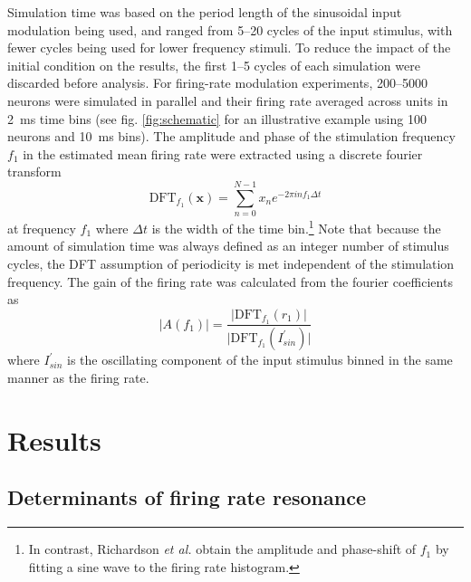 \documentclass[12pt]{article}
\renewcommand{\vec}[1]{\mathbf{#1}}
\begin{document}
Simulation time was based on the period length of the sinusoidal input modulation being used, and ranged from 5--20 cycles of the input stimulus, with fewer cycles being used for lower frequency stimuli.
To reduce the impact of the initial condition on the results, the first 1--5 cycles of each simulation were discarded before analysis.
For firing-rate modulation experiments, 200--5000 neurons were simulated in parallel and their firing rate averaged across units in \SI{2}{\ms} time bins (see fig. \ref{fig:schematic} for an illustrative example using 100 neurons and \SI{10}{\ms} bins).
The amplitude and phase of the stimulation frequency $f_1$ in the estimated mean firing rate were extracted using a discrete fourier transform
\begin{equation}
    \mathrm{DFT}_{f_1}(\vec{x}) = \sum_{n = 0}^{N - 1} x_n e^{-2 \pi i n f_1 \Delta t}
\end{equation}
at frequency $f_1$ where $\Delta t$ is the width of the time bin.\footnote{In contrast, Richardson \textit{et al.} obtain the amplitude and phase-shift of $f_1$ by fitting a sine wave to the firing rate histogram.}
Note that because the amount of simulation time was always defined as an integer number of stimulus cycles, the DFT assumption of periodicity is met independent of the stimulation frequency.
The gain of the firing rate was calculated from the fourier coefficients as
\begin{equation}
    \vert A(f_1) \vert = \frac{ \vert \mathrm{DFT}_{f_1}(r_1) \vert }{ \vert \mathrm{DFT}_{f_1}(I_{sin}^\prime) \vert }
\end{equation}
where $I_{sin}^\prime$ is the oscillating component of the input stimulus binned in the same manner as the firing rate.


\section{Results}

\subsection{Determinants of firing rate resonance}
\end{document}
